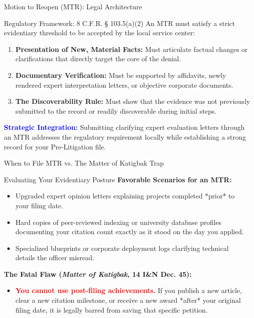 \documentclass[11pt]{beamer}
\begin{document}
	
	\begin{frame}{Motion to Reopen (MTR): Legal Architecture}
		\scriptsize
		\begin{block}{Regulatory Framework: 8 C.F.R. § 103.5(a)(2)}
			An MTR must satisfy a strict evidentiary threshold to be accepted by the local service center:
			\begin{enumerate}
				\item \textbf{Presentation of New, Material Facts:} Must articulate factual changes or clarifications that directly target the core of the denial.
				\item \textbf{Documentary Verification:} Must be supported by affidavits, newly rendered expert interpretation letters, or objective corporate documents.
				\item \textbf{The Discoverability Rule:} Must show that the evidence was not previously submitted to the record or readily discoverable during initial steps.
			\end{enumerate}
			\vspace{0.1cm}
			\textcolor{blue}{\textbf{Strategic Integration:}} Submitting clarifying expert evaluation letters through an MTR addresses the regulatory requirement locally while establishing a strong record for your Pre-Litigation file.
		\end{block}
	\end{frame}
	
	\begin{frame}{When to File MTR vs. The Matter of Katigbak Trap}
		\scriptsize
		\begin{block}{Evaluating Your Evidentiary Posture}
			\textbf{Favorable Scenarios for an MTR:}
			\begin{itemize}
				\item Upgraded expert opinion letters explaining projects completed *prior* to your filing date.
				\item Hard copies of peer-reviewed indexing or university database profiles documenting your citation count exactly as it stood on the day you applied.
				\item Specialized blueprints or corporate deployment logs clarifying technical details the officer misread.
			\end{itemize}
			\textbf{The Fatal Flaw (\textit{Matter of Katigbak}, 14 I\&N Dec. 45):}
			\begin{itemize}
				\item \textcolor{red}{\textbf{You cannot use post-filing achievements.}} If you publish a new article, clear a new citation milestone, or receive a new award *after* your original filing date, it is legally barred from saving that specific petition.
			\end{itemize}
		\end{block}
	\end{frame}
	
\end{document}
